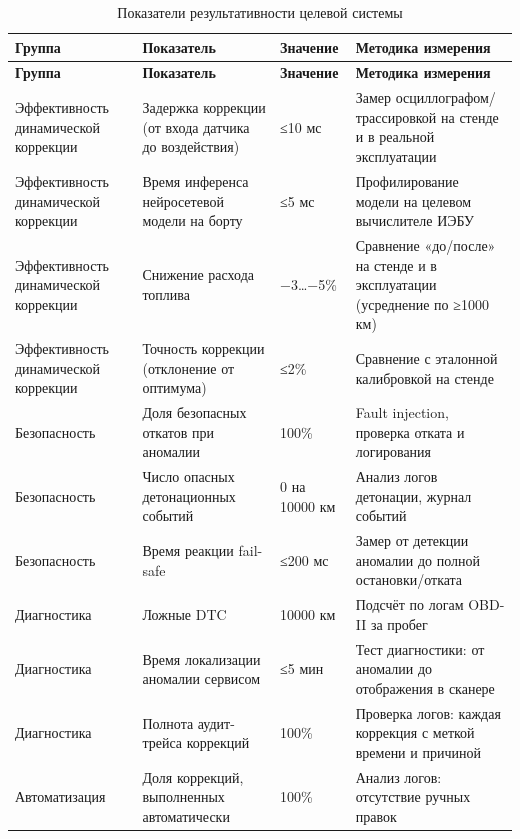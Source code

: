\documentclass[14pt, a4paper]{extarticle}
\begin{document}
				\noindent
				\begin{xltabular}{\textwidth}{|L|L|L|L|}
					\caption{Показатели результативности целевой системы}\label{tab:performance}\\
					\hline
					\textbf{Группа} & \textbf{Показатель} & \textbf{Значение} & \textbf{Методика измерения} \\
					\hline
					\endfirsthead
					\hline
					\textbf{Группа} & \textbf{Показатель} & \textbf{Значение} & \textbf{Методика измерения} \\
					\hline
					\endhead
					\hline
					\endfoot
					\hline
					\endlastfoot
					Эффективность динамической коррекции & Задержка коррекции (от входа датчика до воздействия) & ≤10 мс & Замер осциллографом/трассировкой на стенде и в реальной эксплуатации \\
					\hline
					Эффективность динамической коррекции & Время инференса нейросетевой модели на борту & ≤5 мс & Профилирование модели на целевом вычислителе ИЭБУ \\
					\hline
					Эффективность динамической коррекции & Снижение расхода топлива & −3…−5\% & Сравнение «до/после» на стенде и в эксплуатации (усреднение по	≥1000 км) \\
					\hline
					Эффективность динамической коррекции & Точность коррекции (отклонение от оптимума) & ≤2\% & Сравнение с эталонной калибровкой на стенде \\
					\hline
					Безопасность & Доля безопасных откатов при аномалии & 100\% & Fault injection, проверка отката и логирования \\
					\hline
					Безопасность & Число опасных детонационных событий & 0 на 10000 км & Анализ логов детонации, журнал событий \\
					\hline
					Безопасность & Время реакции fail-safe & ≤200 мс & Замер от детекции аномалии до полной остановки/отката \\
					\hline
					Диагностика & Ложные DTC & 10000 км & Подсчёт по логам OBD-II за пробег \\
					\hline
					Диагностика & Время локализации аномалии сервисом & ≤5 мин & Тест диагностики: от аномалии до отображения в сканере \\
					\hline
					Диагностика & Полнота аудит-трейса коррекций & 100\% & Проверка логов: каждая коррекция с меткой времени и причиной \\
					\hline
					Автоматизация & Доля коррекций, выполненных автоматически & 100\% & Анализ логов: отсутствие ручных правок \\

\end{xltabular}
\end{document}
